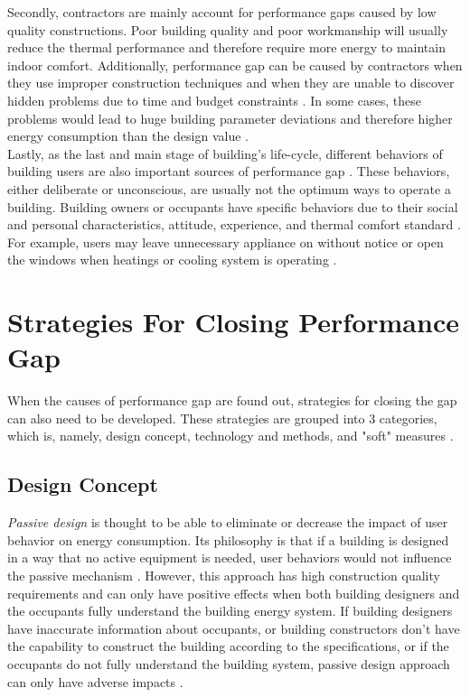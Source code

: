 		Secondly, contractors are mainly account for performance gaps caused by low quality constructions. Poor building quality and poor workmanship will usually reduce the thermal performance and therefore require more energy to maintain indoor comfort. Additionally, performance gap can be caused by contractors when they use improper construction techniques and when they are unable to discover hidden problems due to time and budget constraints \cite{DEWILDE201440}. In some cases, these problems would lead to huge building parameter deviations and therefore higher energy consumption than the design value \cite{FREI2017421,DEWILDE201440}.\\ 

		Lastly, as the last and main stage of building's life-cycle, different behaviors of building users are also important sources of performance gap \cite{ZOU2018165}. These behaviors, either deliberate or unconscious, are usually not the optimum ways to operate a building. Building owners or occupants have specific behaviors due to their social and personal characteristics, attitude, experience, and thermal comfort standard \cite{userevaluations,LAWRENCE2016651}. For example, users may leave unnecessary appliance on without notice or open the windows when heatings or cooling system is operating \cite{FREI2017421}.\\

	\section{Strategies For Closing Performance Gap} 
		When the causes of performance gap are found out, strategies for closing the gap can also need to be developed. These strategies are grouped into 3 categories, which is, namely, design concept, technology and methods, and "soft" measures \cite{ZOU2018165}.

		\subsection{Design Concept}
			\textit{Passive design} is thought to be able to eliminate or decrease the impact of user behavior on energy consumption. Its philosophy is that if a building is designed in a way that no active equipment is needed, user behaviors would not influence the passive mechanism \cite{BLIGHT2013183,NORFORD1994121}. However, this approach has high construction quality requirements and can only have positive effects when both building designers and the occupants fully understand the building energy system. If building designers have inaccurate information about occupants, or building constructors don't have the capability to construct the building according to the specifications, or if the occupants do not fully understand the building system, passive design approach can only have adverse impacts \cite{ZOU2018165}.\\

